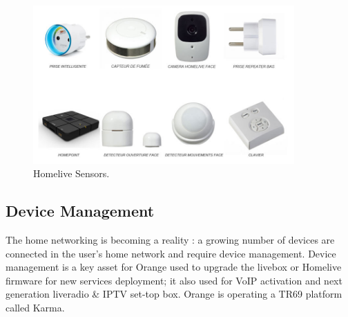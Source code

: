 \begin{figure}[htbp]
	\centering
		\includegraphics[width=10cm]{Figures/home-live_capteurs.jpg}
	\caption[Homelive Sensors]{Homelive Sensors.}%
	\label{fig:2}
\end{figure}
\subsection{Device Management}
The home networking is becoming a reality : a growing number of devices are connected in the user's home network and require device management. Device management is a key asset for Orange used to upgrade the livebox or Homelive firmware for new services deployment; it also used for VoIP activation and next generation liveradio \& IPTV set-top box. Orange is operating a TR69 platform called Karma.

